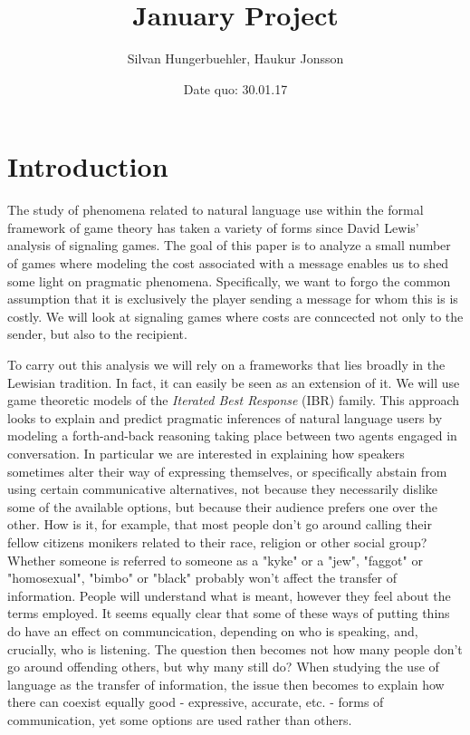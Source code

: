 \documentclass{article}
\title{January Project}
\author{Silvan Hungerbuehler, Haukur Jonsson}
\date{Date quo: 30.01.17}
\begin{document}
\maketitle
\section{Introduction}
The study of phenomena related to natural language use within the formal framework of game theory has taken a variety of forms since David Lewis' \cite{david1969convention} analysis of signaling games. The goal of this paper is to analyze a small number of games where modeling the cost associated with a message enables us to shed some light on pragmatic phenomena. Specifically, we want to forgo the common assumption that it is exclusively the player sending a message for whom this is is costly. We will look at signaling games where costs are conncected not only to the sender, but also to the recipient.

To carry out this analysis we will rely on a frameworks that lies broadly in the Lewisian tradition. In fact, it can easily be seen as an extension of it. We will use game theoretic models of the \textit{Iterated Best Response} (IBR) family. This approach looks to explain and predict pragmatic inferences of natural language users by modeling a forth-and-back reasoning taking place between two agents engaged in conversation. In particular we are interested in explaining how speakers sometimes alter their way of expressing themselves, or specifically abstain from using certain communicative alternatives, not because they necessarily dislike some of the available options, but because their audience prefers one over the other. How is it, for example, that most people don't go around calling their fellow citizens monikers related to their race, religion or other social group? Whether someone is referred to someone as a "kyke" or a "jew", "faggot" or "homosexual", "bimbo" or "black" probably won't affect the transfer of information. People will understand what is meant, however they feel about the terms employed. It seems equally clear that some of these ways of putting thins do have an effect on communcication, depending on who is speaking, and, crucially, who is listening. The question then becomes not how many people don't go around offending others, but why many still do? When studying the use of language as the transfer of information, the issue then becomes to explain how there can coexist equally good - expressive, accurate, etc. - forms of communication, yet some options are used rather than others.
\end{document}
